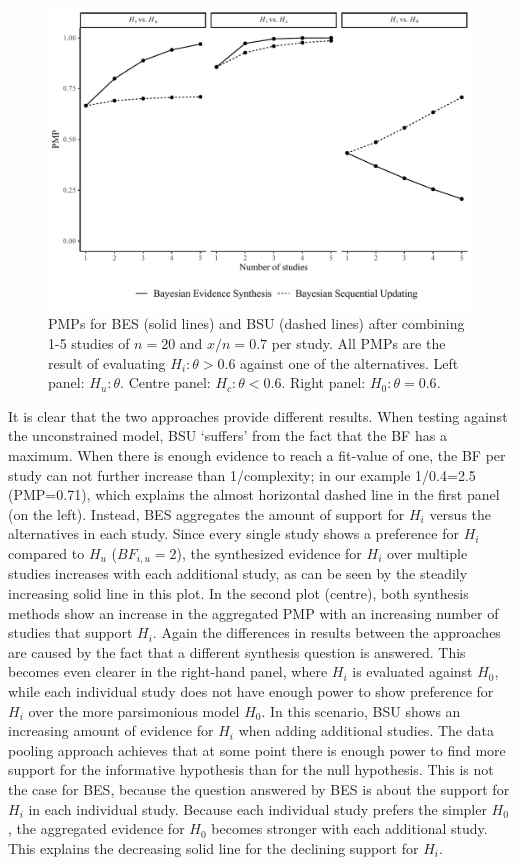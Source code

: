 \documentclass[11pt,reqno]{article}
\begin{document}
\begin{figure}[ht]
   \centerline{\includegraphics[width=14cm]{r-files-bes-klugkist-volker-2022/Figures/bes_bsu_7_pmp}}
 \caption{PMPs for BES (solid lines) and BSU (dashed lines) after combining 1-5 studies of $n=20$ and $x/n=0.7$ per study. All PMPs are the result of evaluating $H_i: \theta>0.6$ against one of the alternatives. Left panel: $H_u: \theta$. Centre panel: $H_c: \theta<0.6$. Right panel: $H_0: \theta=0.6$.}
 \label{Aggregated}
\end{figure}


It is clear that the two approaches provide different results. When testing against the unconstrained model, BSU `suffers' from the fact that the BF has a maximum. When there is enough evidence to reach a fit-value of one, the BF per study can not further increase than 1/complexity; in our example 1/0.4=2.5 (PMP=0.71), which explains the almost horizontal dashed line in the first panel (on the left). Instead, BES aggregates the amount of support for $H_i$ versus the alternatives in each study. Since every single study shows a preference for $H_i$ compared to $H_u$ ($BF_{i,u}=2$), the synthesized evidence for $H_i$ over multiple studies increases with each additional study, as can be seen by the steadily increasing solid line in this plot. In the second plot (centre), both synthesis methods show an increase in the aggregated PMP with an increasing number of studies that support $H_i$. Again the differences in results between the approaches are caused by the fact that a different synthesis question is answered. This becomes even clearer in the right-hand panel, where $H_i$ is evaluated against $H_0$, while each individual study does not have enough power to show preference for $H_i$ over the more parsimonious model $H_0$. In this scenario, BSU shows an increasing amount of evidence for $H_i$ when adding additional studies. The data pooling approach achieves that at some point there is enough power to find more support for the informative hypothesis than for the null hypothesis. This is not the case for BES, because the question answered by BES is about the support for $H_i$ in each individual study. Because each individual study prefers the simpler $H_0$, the aggregated evidence for $H_0$ becomes stronger with each additional study. This explains the decreasing solid line for the declining support for $H_i$.
\end{document}
